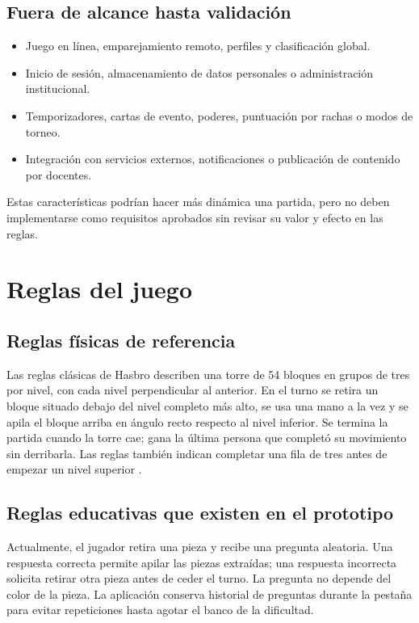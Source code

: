 \documentclass[11pt,letterpaper]{article}
\begin{document}
\subsection{Fuera de alcance hasta validación}
\begin{itemize}
  \item Juego en línea, emparejamiento remoto, perfiles y clasificación global.
  \item Inicio de sesión, almacenamiento de datos personales o administración institucional.
  \item Temporizadores, cartas de evento, poderes, puntuación por rachas o modos de torneo.
  \item Integración con servicios externos, notificaciones o publicación de contenido por docentes.
\end{itemize}
Estas características podrían hacer más dinámica una partida, pero no deben implementarse como requisitos aprobados sin revisar su valor y efecto en las reglas.

\section{Reglas del juego}

\subsection{Reglas físicas de referencia}
Las reglas clásicas de Hasbro describen una torre de 54 bloques en grupos de tres por nivel, con cada nivel perpendicular al anterior. En el turno se retira un bloque situado debajo del nivel completo más alto, se usa una mano a la vez y se apila el bloque arriba en ángulo recto respecto al nivel inferior. Se termina la partida cuando la torre cae; gana la última persona que completó su movimiento sin derribarla. Las reglas también indican completar una fila de tres antes de empezar un nivel superior \cite{hasbrojenga}.

\subsection{Reglas educativas que existen en el prototipo}
Actualmente, el jugador retira una pieza y recibe una pregunta aleatoria. Una respuesta correcta permite apilar las piezas extraídas; una respuesta incorrecta solicita retirar otra pieza antes de ceder el turno. La pregunta no depende del color de la pieza. La aplicación conserva historial de preguntas durante la pestaña para evitar repeticiones hasta agotar el banco de la dificultad.
\end{document}
